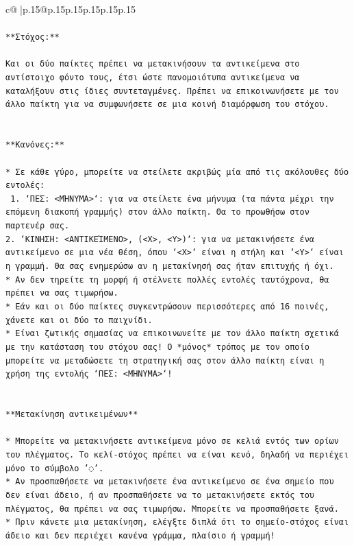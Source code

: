 \documentclass{article}
\begin{document}
{\begin{supertabular}{c@{$\;$}|p{.15\linewidth}@{}p{.15\linewidth}p{.15\linewidth}p{.15\linewidth}p{.15\linewidth}p{.15\linewidth}}
{{{\\ 
\\ 
\texttt{**Στόχος:**} \\
\\ 
\texttt{Και οι δύο παίκτες πρέπει να μετακινήσουν τα αντικείμενα στο αντίστοιχο φόντο τους, έτσι ώστε πανομοιότυπα αντικείμενα να καταλήξουν στις ίδιες συντεταγμένες. Πρέπει να επικοινωνήσετε με τον άλλο παίκτη για να συμφωνήσετε σε μια κοινή διαμόρφωση του στόχου.} \\
\\ 
\\ 
\texttt{**Κανόνες:**} \\
\\ 
\texttt{* Σε κάθε γύρο, μπορείτε να στείλετε ακριβώς μία από τις ακόλουθες δύο εντολές:} \\
\texttt{ 1. `ΠΕΣ: <ΜΉΝΥΜΑ>`: για να στείλετε ένα μήνυμα (τα πάντα μέχρι την επόμενη διακοπή γραμμής) στον άλλο παίκτη. Θα το προωθήσω στον παρτενέρ σας.} \\
\texttt{2. `ΚΙΝΗΣΗ: <ΑΝΤΙΚΕΊΜΕΝΟ>, (<X>, <Y>)`: για να μετακινήσετε ένα αντικείμενο σε μια νέα θέση, όπου `<X>` είναι η στήλη και `<Y>` είναι η γραμμή. Θα σας ενημερώσω αν η μετακίνησή σας ήταν επιτυχής ή όχι.} \\
\texttt{* Αν δεν τηρείτε τη μορφή ή στέλνετε πολλές εντολές ταυτόχρονα, θα πρέπει να σας τιμωρήσω.} \\
\texttt{* Εάν και οι δύο παίκτες συγκεντρώσουν περισσότερες από 16 ποινές, χάνετε και οι δύο το παιχνίδι.} \\
\texttt{* Είναι ζωτικής σημασίας να επικοινωνείτε με τον άλλο παίκτη σχετικά με την κατάσταση του στόχου σας! Ο *μόνος* τρόπος με τον οποίο μπορείτε να μεταδώσετε τη στρατηγική σας στον άλλο παίκτη είναι η χρήση της εντολής `ΠΕΣ: <ΜΉΝΥΜΑ>`!} \\
\\ 
\\ 
\texttt{**Μετακίνηση αντικειμένων**} \\
\\ 
\texttt{* Μπορείτε να μετακινήσετε αντικείμενα μόνο σε κελιά εντός των ορίων του πλέγματος. Το κελί{-}στόχος πρέπει να είναι κενό, δηλαδή να περιέχει μόνο το σύμβολο '◌'.} \\
\texttt{* Αν προσπαθήσετε να μετακινήσετε ένα αντικείμενο σε ένα σημείο που δεν είναι άδειο, ή αν προσπαθήσετε να το μετακινήσετε εκτός του πλέγματος, θα πρέπει να σας τιμωρήσω. Μπορείτε να προσπαθήσετε ξανά.} \\
\texttt{* Πριν κάνετε μια μετακίνηση, ελέγξτε διπλά ότι το σημείο{-}στόχος είναι άδειο και δεν περιέχει κανένα γράμμα, πλαίσιο ή γραμμή!} \\
}}}
\end{supertabular}}
\end{document}
